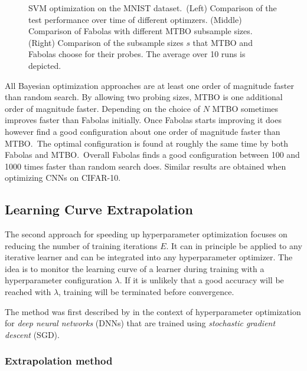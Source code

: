\begin{figure}
\begin{subfigure}{0.34\textwidth}
	\end{subfigure}
	\caption{
		SVM optimization on the MNIST dataset.\
		(Left) Comparison of the test performance over time of different optimzers.
		(Middle) Comparison of Fabolas with different MTBO subsample sizes.
		(Right) Comparison of the subsample sizes \(s\) that MTBO and Fabolas choose for their probes.
		The average over 10 runs is depicted.
	}\label{fig:fabolas:eval}
\end{figure}
All Bayesian optimization approaches are at least one order of magnitude faster than random search.
By allowing two probing sizes, MTBO is one additional order of magnitude faster.
Depending on the choice of \(N\) MTBO sometimes improves faster than Fabolas initially.
Once Fabolas starts improving it does however find a good configuration about one order of magnitude faster than MTBO.\
The optimal configuration is found at roughly the same time by both Fabolas and MTBO.\
Overall Fabolas finds a good configuration between 100 and 1000 times faster than random search does.
Similar results are obtained when optimizing CNNs on CIFAR-10.

\subsection{Learning Curve Extrapolation}%
\label{sec:hyperparams:earlyterm}

The second approach for speeding up hyperparameter optimization focuses on reducing the number of training iterations \(E\).
It can in principle be applied to any iterative learner and can be integrated into any hyperparameter optimizer.
The idea is to monitor the learning curve of a learner during training with a hyperparameter configuration \(\lambda\).
If it is unlikely that a good accuracy will be reached with \(\lambda\), training will be terminated before convergence.

The method was first described by \citet{Domhan2015} in the context of hyperparameter optimization for \textit{deep neural networks} (DNNs) that are trained using \textit{stochastic gradient descent} (SGD).

\subsubsection{Extrapolation method}%
\label{sec:hyperparams:earlyterm:method}

